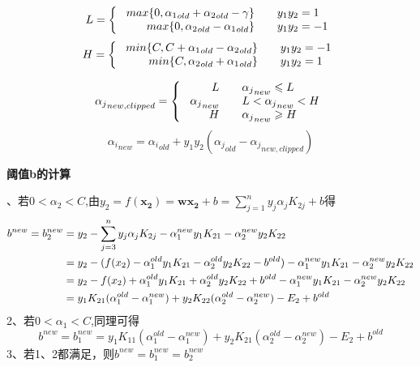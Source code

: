 \documentclass[UTF8]{ctexart}
\begin{document}
\begin{equation}\notag
    L=\left\{\
    \begin{array}{rcl}
        max\{0,{\alpha_1}_{old}+{\alpha_2}_{old} - \gamma\} && {y_1y_2=1} \\
        max\{0,{\alpha_2}_{old} - {\alpha_1}_{old} \} && {y_1y_2=-1}
    \end{array}\right.
\end{equation}
\begin{equation}\notag
    H=\left\{\
    \begin{array}{rcl}
        min\{C,C+{\alpha_1}_{old} - {\alpha_2}_{old}\} && {y_1y_2=-1} \\
        min\{C,{\alpha_2}_{old} + {\alpha_1}_{old} \} && {y_1y_2=1}
    \end{array}\right.
\end{equation}

\begin{equation}\notag
    {\alpha_j}_{new,clipped}=\left\{\
    \begin{array}{rcl}
        L && {{\alpha_j}_{new} \leqslant L} \\
        {\alpha_j}_{new} && {L<{\alpha_j}_{new} < H} \\
        H && {{\alpha_j}_{new} \geqslant H}
    \end{array}\right.
\end{equation}
$${\alpha_i}_{new}={\alpha_i}_{old} + y_1y_2({\alpha_j}_{old}-{\alpha_j}_{new,clipped})$$

\noindent \large \textbf{阈值b的计算}

、若$0<\alpha_2<C$,由$y_2=f(\boldsymbol{x_2})=\boldsymbol w \boldsymbol{x_2} + b=\sum_{j=1}^n y_j\alpha_j K_{2j} +b$得
\begin{equation}\notag
    \begin{aligned}
        b^{new}=b_2^{new}&=y_2-\sum_{j=3}^n y_j\alpha_j K_{2j}-\alpha_1^{new}y_1K_{21}-\alpha_2^{new}y_2K_{22}\\
        &=y_2-(f(x_2)-\alpha_1^{old}y_1K_{21}-\alpha_2^{old}y_2K_{22}-b^{old})-\alpha_1^{new}y_1K_{21}-\alpha_2^{new}y_2K_{22}\\
        &=y_2-f(x_2)+\alpha_1^{old}y_1K_{21}+\alpha_2^{old}y_2K_{22}+b^{old}-\alpha_1^{new}y_1K_{21}-\alpha_2^{new}y_2K_{22}\\
        &=y_1K_{21}(\alpha_1^{old}-\alpha_1^{new})+y_2K_{22}(\alpha_2^{old}-\alpha_2^{new})-E_2+b^{old}
    \end{aligned}
\end{equation}
2、若$0<\alpha_1<C$,同理可得
$$b^{new}=b_1^{new}=y_1K_{11}(\alpha_1^{old}-\alpha_1^{new})+y_2K_{21}(\alpha_2^{old}-\alpha_2^{new})-E_2+b^{old}$$
3、若1、2都满足，则$b^{new}=b_1^{new}=b_2^{new}$
\end{document}

